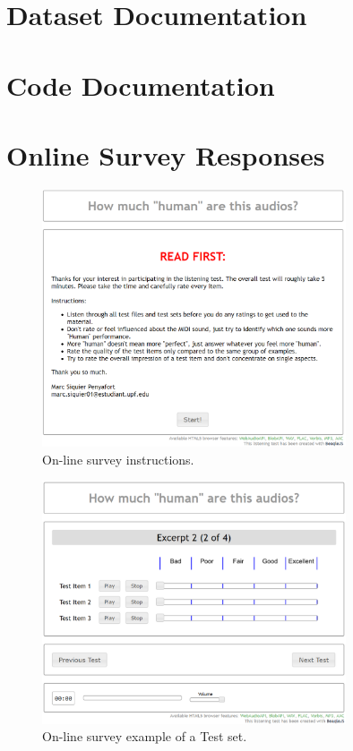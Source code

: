 \begin{appendices}
\cleardoublepage
\chapter{Dataset Documentation}
\label{app:dataset}


\cleardoublepage

\chapter{Code Documentation} 
\label{app:code}
\cleardoublepage

\chapter{Online Survey Responses}
\label{app:survey}

\begin{figure}
\caption{On-line survey instructions.}
\label{fig_app:survey_instructions}
\centering
\includegraphics[width=0.8\textwidth]{Figures/survey_instructions.PNG}
\end{figure}

\begin{figure}
\caption{On-line survey example of a Test set.}
\label{fig_app:survey_test}
\centering
\includegraphics[width=0.8\textwidth]{Figures/survey_test.PNG}
\end{figure}


\end{appendices}
